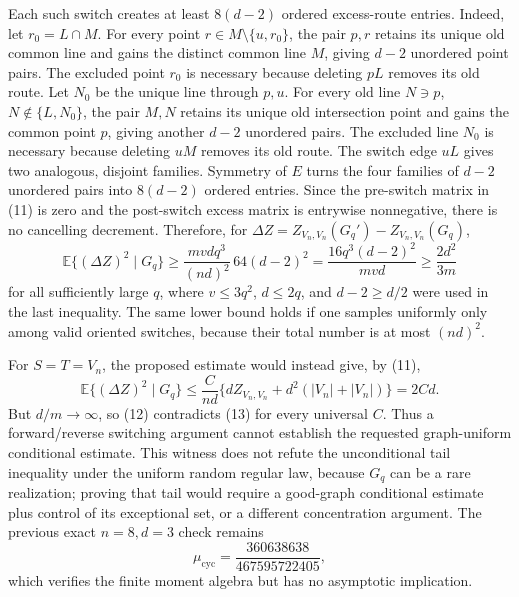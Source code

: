 Each such switch creates at least \(8(d-2)\) ordered excess-route entries.  Indeed,
let \(r_0=L\cap M\).  For every point
\(r\in M\setminus\{u,r_0\}\), the pair \(p,r\) retains its unique old common line
and gains the distinct common line \(M\), giving \(d-2\) unordered point pairs.
The excluded point \(r_0\) is necessary because deleting \(pL\) removes its old
route.  Let \(N_0\) be the unique line through \(p,u\).  For every old line
\(N\ni p\), \(N\notin\{L,N_0\}\), the pair \(M,N\) retains its unique old
intersection point and gains the common point \(p\), giving another \(d-2\)
unordered pairs.  The excluded line \(N_0\) is necessary because deleting \(uM\)
removes its old route.  The switch edge \(uL\) gives two analogous, disjoint
families.  Symmetry of \(E\) turns the four families of \(d-2\) unordered pairs
into \(8(d-2)\) ordered entries.  Since the pre-switch
matrix in (11) is zero and the post-switch excess matrix is entrywise nonnegative,
there is no cancelling decrement.  Therefore, for \(\Delta Z=Z_{V_n,V_n}(G_q')-
Z_{V_n,V_n}(G_q)\),
\[
 \mathbb E\{(\Delta Z)^2\mid G_q\}
 \ge \frac{mvdq^3}{(nd)^2}\,64(d-2)^2
 =\frac{16q^3(d-2)^2}{mvd}
 \ge \frac{2d^2}{3m}                                      \tag{12}
\]
for all sufficiently large \(q\), where \(v\le3q^2\), \(d\le2q\), and
\(d-2\ge d/2\) were used in the last inequality.  The same lower bound holds if
one samples uniformly only among valid oriented switches, because their total
number is at most \((nd)^2\).

For \(S=T=V_n\), the proposed estimate would instead give, by (11),
\[
 \mathbb E\{(\Delta Z)^2\mid G_q\}
 \le \frac{C}{nd}\{dZ_{V_n,V_n}+d^2(|V_n|+|V_n|)\}
 =2Cd.                                                     \tag{13}
\]
But \(d/m\to\infty\), so (12) contradicts (13) for every universal \(C\).
Thus a forward/reverse switching argument cannot establish the requested
graph-uniform conditional estimate.  This witness does not refute the unconditional
tail inequality under the uniform random regular law, because \(G_q\) can be a
rare realization; proving that tail would require a good-graph conditional estimate
plus control of its exceptional set, or a different concentration argument.  The
previous exact \(n=8,d=3\) check remains
\[
 \mu_{\mathrm{cyc}}
 =\frac{360638638}{467595722405},
\]
which verifies the finite moment algebra but has no asymptotic implication.

